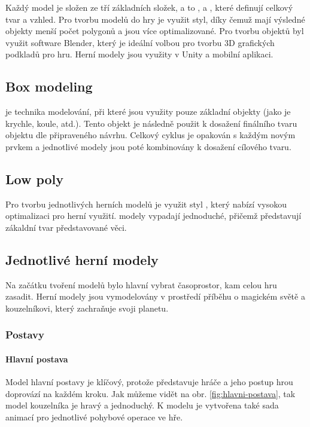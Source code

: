 Každý model je složen ze tří základních složek, a to ,  a , které definují celkový tvar a vzhled. Pro tvorbu modelů do hry je využit \cite{LowPoly} styl, díky čemuž mají výsledné objekty menší počet polygonů a jsou více optimalizované. Pro tvorbu objektů byl využit software Blender, který je ideální volbou pro tvorbu 3D grafických podkladů pro hru. Herní modely jsou využity v Unity a mobilní aplikaci.

\subsection{Box modeling}
\cite{BoxModeling} je technika modelování, při které jsou využity pouze základní objekty (jako je krychle, koule, atd.). Tento objekt je následně použit k dosažení finálního tvaru objektu dle připraveného návrhu. Celkový cyklus je opakován s každým novým prvkem a jednotlivé modely jsou poté kombinovány k dosažení cílového tvaru.

\subsection{Low poly}
Pro tvorbu jednotlivých herních modelů je využit styl \cite{LowPoly}, který nabízí vysokou optimalizaci pro herní využití.  modely vypadají jednoduché, přičemž představují zákaldní tvar představované věci.

\subsection{Jednotlivé herní modely}
Na začátku tvoření modelů bylo hlavní vybrat časoprostor, kam celou hru zasadit. Herní modely jsou vymodelovány v prostředí příběhu o magickém světě a kouzelníkovi, který zachraňuje svoji planetu.

\subsubsection{Postavy}
\paragraph{Hlavní postava}
Model hlavní postavy je klíčový, protože představuje hráče a jeho postup hrou doprovází na každém kroku. Jak můžeme vidět na obr. \ref{fig:hlavni-postava}, tak model kouzelníka je hravý a jednoduchý. K modelu je vytvořena také sada animací pro jednotlivé pohybové operace ve hře.

